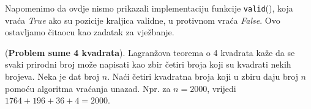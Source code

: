 Napomenimo da ovdje nismo prikazali implementaciju funkcije \texttt{valid}(), koja vraća \textit{True} ako su pozicije kraljica  validne, u protivnom vraća \textit{False}. Ovo ostavljamo čitaocu kao zadatak za vježbanje. 





    



\begin{example}
	(\textbf{Problem sume 4 kvadrata}). Lagranžova teorema o 4 kvadrata kaže da se svaki prirodni broj može napisati kao zbir četiri broja koji su kvadrati nekih brojeva. Neka je dat broj $n$. Naći četiri kvadratna broja koji u zbiru daju broj $n$ pomoću algoritma vraćanja unazad.	Npr. za $n=2000$, vrijedi $1764 + 196 + 36 + 4 = 2000. $
\end{example}

